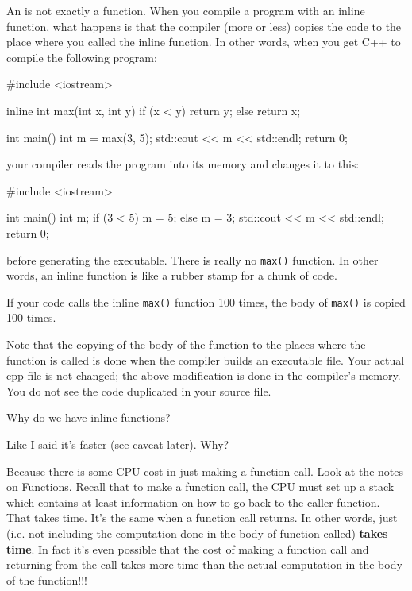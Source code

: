 An  is not exactly a function. When you compile a program with an inline function, what happens is that the compiler (more or less) copies the code to the place where you called the inline function. In other words, when you get C++ to compile the following program:

\begin{consolethree}[escapeinside=||]
#include <iostream>

inline
int max(int x, int y)
{
    if (x < y) return y;
    else return x;
}

int main()
{
    int m = max(3, 5);
    std::cout << m << std::endl;
    return 0;
}
\end{consolethree}

your compiler reads the program into its memory and changes it to this:

\begin{consolethree}[escapeinside=||]
#include <iostream>

int main()
{
    int m;
    if (3 < 5) m = 5;
    else m = 3;
    std::cout << m << std::endl;
    return 0;
}
\end{consolethree}

before generating the executable. There is really no \texttt{max()} function. In other words, an inline function is like a rubber stamp for a chunk of code.

If your code calls the inline \texttt{max()} function 100 times, the body of \texttt{max()} is copied 100 times.

Note that the copying of the body of the function to the places where the function is called is done when the compiler builds an executable file. Your actual cpp file is not changed; the above modification is done in the compiler's memory. You do not see the code duplicated in your source file.



\newpage{}

Why do we have inline functions?

Like I said it's faster (see caveat later). Why?

Because there is some CPU cost in just making a function call. Look at the notes on Functions. Recall that to make a function call, the CPU must set up a stack which contains at least information on how to go back to the caller function. That takes time. It's the same when a function call returns. In other words, just  (i.e. not including the computation done in the body of function called) \textbf{takes time}. In fact it's even possible that the cost of making a function call and returning from the call takes more time than the actual computation in the body of the function!!!

